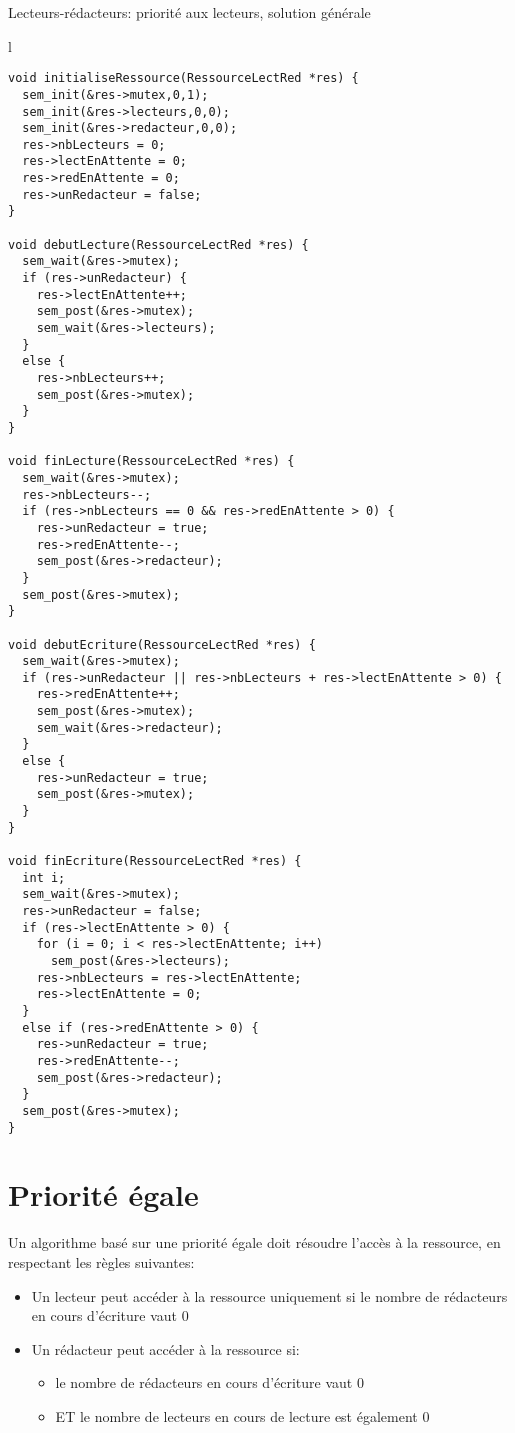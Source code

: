 \begin{algorithm}[h!tp]
\caption{Lecteurs-rédacteurs: priorité aux lecteurs, solution générale}\label{lectred:prioritelecteurgenerale}
\begin{center}
\begin{tabular}{l}
\lstset{language=C++}
\begin{lstlisting}
void initialiseRessource(RessourceLectRed *res) {
  sem_init(&res->mutex,0,1);
  sem_init(&res->lecteurs,0,0);
  sem_init(&res->redacteur,0,0);
  res->nbLecteurs = 0;
  res->lectEnAttente = 0;
  res->redEnAttente = 0;
  res->unRedacteur = false;
}

void debutLecture(RessourceLectRed *res) {
  sem_wait(&res->mutex);
  if (res->unRedacteur) {
    res->lectEnAttente++;
    sem_post(&res->mutex);
    sem_wait(&res->lecteurs);
  }
  else {
    res->nbLecteurs++;
    sem_post(&res->mutex);
  }
}

void finLecture(RessourceLectRed *res) {
  sem_wait(&res->mutex);
  res->nbLecteurs--;
  if (res->nbLecteurs == 0 && res->redEnAttente > 0) {
    res->unRedacteur = true;
    res->redEnAttente--;
    sem_post(&res->redacteur);
  }
  sem_post(&res->mutex);
}

void debutEcriture(RessourceLectRed *res) {
  sem_wait(&res->mutex);
  if (res->unRedacteur || res->nbLecteurs + res->lectEnAttente > 0) {
    res->redEnAttente++;
    sem_post(&res->mutex);
    sem_wait(&res->redacteur);
  }
  else {
    res->unRedacteur = true;
    sem_post(&res->mutex);
  }
}

void finEcriture(RessourceLectRed *res) {
  int i;
  sem_wait(&res->mutex);
  res->unRedacteur = false;
  if (res->lectEnAttente > 0) {
    for (i = 0; i < res->lectEnAttente; i++)
      sem_post(&res->lecteurs);
    res->nbLecteurs = res->lectEnAttente;
    res->lectEnAttente = 0;
  }
  else if (res->redEnAttente > 0) {
    res->unRedacteur = true;
    res->redEnAttente--;
    sem_post(&res->redacteur);
  }
  sem_post(&res->mutex);
}
\end{lstlisting}
\end{tabular}
\end{center}
\end{algorithm}


\section{Priorité égale}
Un algorithme basé sur une priorité égale doit résoudre l'accès à la ressource, en respectant les règles suivantes:
\begin{itemize}
\item Un lecteur peut accéder à la ressource uniquement si le nombre de rédacteurs en cours d'écriture vaut 0
\item Un rédacteur peut accéder à la ressource si:
\begin{itemize}
\item le nombre de rédacteurs en cours d'écriture vaut 0
\item ET le nombre de lecteurs en cours de lecture est également 0
\end{itemize}
\end{itemize}

